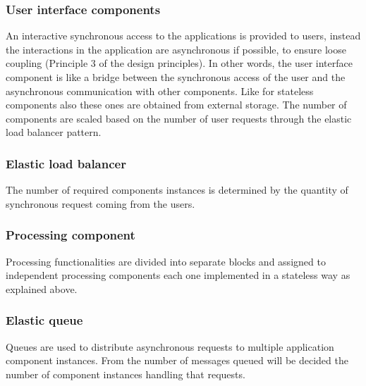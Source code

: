 \subsubsection{User interface components}
An interactive synchronous access to the applications is provided to users, instead the interactions in the application are asynchronous if possible, to ensure loose coupling (Principle 3 of the design principles).
In other words, the user interface component is like a bridge between the synchronous access of the user and the asynchronous communication with other components. Like for stateless components also these ones are obtained from external storage.
The number of components are scaled based on the number of user requests through the elastic load balancer pattern.

\subsubsection{Elastic load balancer}
The number of required components instances is determined by the quantity of synchronous request coming from the users.

\subsubsection{Processing component}
Processing functionalities are divided into separate blocks and assigned to independent processing components each one implemented in a stateless way as explained above.

\subsubsection{Elastic queue}
Queues are used to distribute asynchronous requests to multiple application component instances. From the number of messages queued will be decided the number of component instances handling that requests.

\begin{center}
\end{center}

